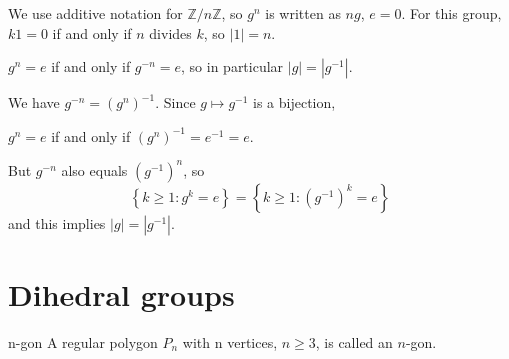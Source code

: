 \begin{ex}
We use additive notation for $\mathbb Z/n\mathbb Z$, so $g^n$ is written as $ng$, $e=0$. For this group, $k1=0$ if and only if $n$ divides $k$, so $|1|=n$.
\end{ex}

\begin{lemma}
$g^n = e$ if and only if $g^{-n}=e$, so in particular $|g|=|g^{-1}|$.
\end{lemma}

\begin{pf}
We have $g^{-n}=(g^n)^{-1}$. Since $g\mapsto g^{-1}$ is a bijection,
\begin{center}
$g^n=e$ if and only if $(g^n)^{-1}=e^{-1}=e$.
\end{center}
But $g^{-n}$ also equals $(g^{-1})^n$, so
$$
\left\{k \geq 1: g^{k}=e\right\}=\left\{k \geq 1:\left(g^{-1}\right)^{k}=e\right\}
$$
and this implies $|g|=|g^{-1}|$.
\end{pf}

\section{Dihedral groups}


\begin{defn}{n-gon}
A regular polygon $P_n$ with n vertices, $n\ge 3$, is called an $n$-gon.
\end{defn}

